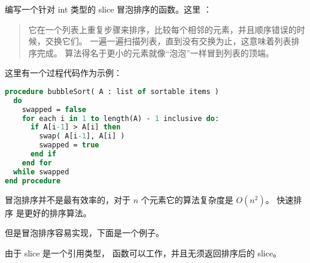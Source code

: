 \begin{Exercise}[title={冒泡排序},difficulty=5]
\label{ex:bubble}
\Question\label{ex:bubble q1} 编写一个针对 int 类型的 slice 冒泡排序的函数。这里 \cite{bubblesort}：
\begin{quote}
它在一个列表上重复步骤来排序，比较每个相邻的元素，并且顺序错误的时候，交换它们。
一遍一遍扫描列表，直到没有交换为止，这意味着列表排序完成。
算法得名于更小的元素就像``泡泡''一样冒到列表的顶端。
\end{quote}

\cite{bubblesort} 这里有一个过程代码作为示例：
\begin{lstlisting}[language=pascal]
procedure bubbleSort( A : list of sortable items )
  do
    swapped = false
    for each i in 1 to length(A) - 1 inclusive do:
      if A[i-1] > A[i] then
        swap( A[i-1], A[i] )
        swapped = true
      end if
    end for
  while swapped
end procedure
\end{lstlisting}
\end{Exercise}

\begin{Answer}
\Question 
冒泡排序并不是最有效率的，对于 $n$ 个元素它的算法复杂度是 $O(n^2)$。
快速排序 \cite{quicksort} 是更好的排序算法。

但是冒泡排序容易实现，下面是一个例子。


由于 slice 是一个引用类型， 函数可以工作，并且无须返回排序后的 slice。
\end{Answer}
